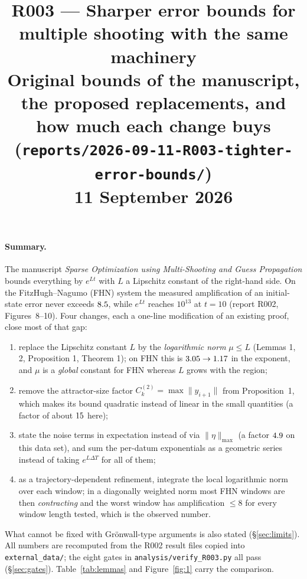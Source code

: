 \documentclass[10pt]{article}
\title{\vspace{-1.6em}\textbf{R003 --- Sharper error bounds for multiple shooting with the same machinery}\\
\large Original bounds of the manuscript, the proposed replacements, and how much each change buys\\
\normalsize(\texttt{reports/2026-09-11-R003-tighter-error-bounds/})\\[3pt]\normalsize 11 September 2026}
\author{\vspace{-4.5em}}
\date{\vspace{-4.5em}}
\newcommand{\norm}[1]{\lVert #1\rVert}
\begin{document}
\maketitle
\vspace{-2.2em}

\paragraph{Summary.} The manuscript \emph{Sparse Optimization using Multi-Shooting and Guess Propagation} bounds everything by $e^{L t}$ with $L$ a Lipschitz constant of the right-hand side. On the FitzHugh--Nagumo (FHN) system the measured amplification of an initial-state error never exceeds $8.5$, while $e^{L t}$ reaches $10^{13}$ at $t=10$ (report R002, Figures~8--10). Four changes, each a one-line modification of an existing proof, close most of that gap:
\begin{enumerate}
\item replace the Lipschitz constant $L$ by the \emph{logarithmic norm} $\mu\le L$ (Lemmas 1, 2, Proposition 1, Theorem 1); on FHN this is $3.05\to1.17$ in the exponent, and $\mu$ is a \emph{global} constant for FHN whereas $L$ grows with the region;
\item remove the attractor-size factor $C^{(2)}_k=\max\norm{y_{i+1}}$ from Proposition~1, which makes its bound quadratic instead of linear in the small quantities (a factor of about $15$ here);
\item state the noise terms in expectation instead of via $\norm{\eta}_{\max}$ (a factor $4.9$ on this data set), and sum the per-datum exponentials as a geometric series instead of taking $e^{L\Delta T}$ for all of them;
\item as a trajectory-dependent refinement, integrate the local logarithmic norm over each window; in a diagonally weighted norm most FHN windows are then \emph{contracting} and the worst window has amplification $\le 8$ for every window length tested, which is the observed number.
\end{enumerate}
What cannot be fixed with Gr\"onwall-type arguments is also stated (\S\ref{sec:limits}). All numbers are recomputed from the R002 result files copied into \texttt{external\_data/}; the eight gates in \texttt{analysis/verify\_R003.py} all pass (\S\ref{sec:gates}). Table~\ref{tab:lemmas} and Figure~\ref{fig:1} carry the comparison.
\end{document}
